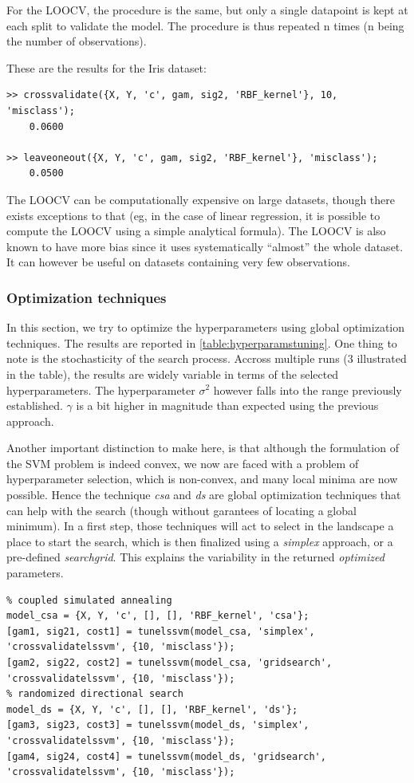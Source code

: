\documentclass[11pt, a4paper]{article}
\begin{document}
For the LOOCV, the procedure is the same, but only a single datapoint
is kept at each split to validate the model. The procedure is thus
repeated n times (n being the number of observations).

These are the results for the Iris dataset:
\begin{verbatim}
>> crossvalidate({X, Y, 'c', gam, sig2, 'RBF_kernel'}, 10, 'misclass');
    0.0600

>> leaveoneout({X, Y, 'c', gam, sig2, 'RBF_kernel'}, 'misclass');
    0.0500
\end{verbatim}

The LOOCV can be computationally expensive on large datasets, though
there exists exceptions to that (eg, in the case of linear regression,
it is possible to compute the LOOCV using a simple analytical
formula). The LOOCV is also known to have more bias since it uses
systematically ``almost'' the whole dataset. It can however be useful
on datasets containing very few observations.

\subsubsection{Optimization techniques}

In this section, we try to optimize the hyperparameters using global
optimization techniques. The results are reported in
\ref{table:hyperparamstuning}. One thing to note is the stochasticity
of the search process. Accross multiple runs (3 illustrated in the
table), the results are widely variable in terms of the selected
hyperparameters. The hyperparameter $\sigma^2$ however falls into the
range previously established. $\gamma$ is a bit higher in magnitude
than expected using the previous approach.

Another important distinction to make here, is that although the
formulation of the SVM problem is indeed convex, we now are faced with
a problem of hyperparameter selection, which is non-convex, and many
local minima are now possible. Hence the technique \emph{csa} and
\emph{ds} are global optimization techniques that can help with the
search (though without garantees of locating a global minimum). In a
first step, those techniques will act to select in the landscape a
place to start the search, which is then finalized using a
\emph{simplex} approach, or a pre-defined \emph{searchgrid}. This
explains the variability in the returned \emph{optimized} parameters.

\begin{lstlisting}
% coupled simulated annealing
model_csa = {X, Y, 'c', [], [], 'RBF_kernel', 'csa'};
[gam1, sig21, cost1] = tunelssvm(model_csa, 'simplex', 'crossvalidatelssvm', {10, 'misclass'});
[gam2, sig22, cost2] = tunelssvm(model_csa, 'gridsearch', 'crossvalidatelssvm', {10, 'misclass'});
% randomized directional search
model_ds = {X, Y, 'c', [], [], 'RBF_kernel', 'ds'};
[gam3, sig23, cost3] = tunelssvm(model_ds, 'simplex', 'crossvalidatelssvm', {10, 'misclass'});
[gam4, sig24, cost4] = tunelssvm(model_ds, 'gridsearch', 'crossvalidatelssvm', {10, 'misclass'});
\end{lstlisting}
\end{document}
